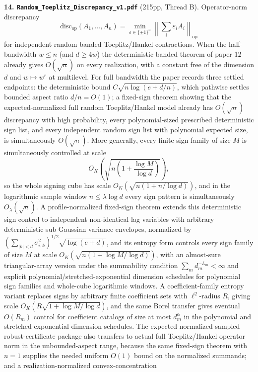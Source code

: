 \documentclass[11pt]{article}
\begin{document}
\textbf{14. \texttt{Random\_Toeplitz\_Discrepancy\_v1.pdf}} (215pp, Thread B).
Operator-norm discrepancy
\[
  \mathrm{disc}_{\mathrm{op}}(A_1,\dots,A_n)
  =\min_{\varepsilon\in\{\pm1\}^n}
  \left\|\sum_i\varepsilon_iA_i\right\|_{\mathrm{op}}
\]
for independent random banded Toeplitz/Hankel contractions.  When the
half-bandwidth $w\le n$ (and $d\ge4w$)
the deterministic banded theorem of paper 12 already gives $O(\sqrt n)$ on every
realization, with a constant free of the dimension $d$ and $w\mapsto w^r$ at
multilevel.  For full bandwidth the paper records three settled endpoints: the
deterministic bound \(C\sqrt{n\log(e+d/n)}\), which pathwise settles bounded
aspect ratio \(d/n=O(1)\); a fixed-sign theorem showing that the
expected-normalized full random Toeplitz/Hankel model already has
\(O(\sqrt n)\) discrepancy with high probability, every polynomial-sized
prescribed deterministic sign list, and every independent random sign list with
polynomial expected size, is simultaneously \(O(\sqrt n)\). More generally,
every finite sign family of size \(M\) is simultaneously controlled at scale
\[
  O_K\!\left(\sqrt{n\left(1+\frac{\log M}{\log d}\right)}\right),
\]
so the whole signing cube has scale
\(O_K(\sqrt{n(1+n/\log d)})\), and in the logarithmic sample window
\(n\le\lambda\log d\) every sign pattern is simultaneously
\(O_{\lambda}(\sqrt n)\).  A profile-normalized fixed-sign theorem extends this
deterministic sign control to independent non-identical lag variables with
arbitrary deterministic sub-Gaussian variance envelopes, normalized by
\((\sum_{|k|<d}\sigma_{i,k}^2)^{1/2}\sqrt{\log(e+d)}\), and its entropy form
controls every sign family of size \(M\) at scale
\(O_K(\sqrt{n(1+\log M/\log d)})\), with an almost-sure triangular-array
version under the summability condition \(\sum_m d_m^{-L_m}<\infty\) and
explicit polynomial/stretched-exponential dimension schedules for polynomial
sign families and whole-cube logarithmic windows.  A coefficient-family
entropy variant replaces signs by arbitrary finite coefficient sets with
\(\ell^2\)-radius \(R\), giving scale
\(O_K(R\sqrt{1+\log M/\log d})\), and the same Borel transfer gives eventual
\(O(R_m)\) control for coefficient catalogs of size at most \(d_m^\alpha\) in
the polynomial and stretched-exponential dimension schedules.  The
expected-normalized sampled robust-certificate package also transfers to actual
full Toeplitz/Hankel operator norm in the
unbounded-aspect range, because the same fixed-sign theorem with \(n=1\)
supplies the needed uniform \(O(1)\) bound on the normalized summands; and a
realization-normalized convex-concentration
\end{document}
